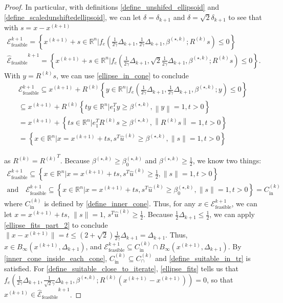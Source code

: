 \documentclass{article}
\theoremstyle{case}
\numberwithin{theorem}{subsection}
\newcommand{\bs}{{\beta^{(\star, k)}}}
\newcommand{\bsk}{{\beta_0^{(\star, k)}}}
\newcommand{\capcones}{{C^{(k)}_{\cap}}}
\newcommand{\dkpo}{\Delta_{k+1}}
\newcommand{\fcki}{{C^{(k)}_{\textrm{in}}}}
\newcommand{\huk}{{{\hat u}^{(k)}}}
\newcommand{\Rn}{\mathbb R^n}
\newcommand{\rotk}{{R^{(k)}}}
\newcommand{\trkpo}{{ B_{\infty}\left(\xkpo, \dkpo\right) }}
\newcommand{\xkpo}{{{x}^{(k+1)}}}
\newcommand{\sdkpo}{{\delta_{k+1}}}
\newcommand{\unshiftedellipsoidpo}{{\mathcal E^{k+1}_{\textrm{feasible}}}}
\newcommand{\scaledunshiftedellipsoidpo}{{{\mathcal {\hat E}_{\text{feasible}}}^{k+1}}}
\begin{document}
\begin{proof}
In particular, with definitions \cref{define_unshifed_ellipsoid} and \cref{define_scaledunshiftedellipsoid},
we can let $\delta = \sdkpo$ and $\delta = \sqrt{2}\sdkpo$ to see that with $s = x - \xkpo$
\begin{align*}
\unshiftedellipsoidpo = \left\{\xkpo + s \in \Rn | f_e\left(\frac 1 {2\gamma} \dkpo, \frac 1 {2\gamma} \dkpo, \bs; \rotk s \right) \le 0 \right\} \\
\scaledunshiftedellipsoidpo = \left\{\xkpo + s \in \Rn | f_e\left(\frac 1 {2\gamma} \dkpo, \sqrt{2} \frac {1}{2\gamma}\dkpo, \bs; \rotk s\right) \le 0 \right\}.
\end{align*}
With $y = \rotk s$,  we can use \cref{ellipse_in_cone} to conclude
\begin{align*}
\unshiftedellipsoidpo
\subseteq \xkpo + \rotk\left\{y \in \Rn | f_e\left(\frac 1 {2\gamma} \dkpo, \frac 1 {2\gamma} \dkpo, \bs; y \right) \le 0 \right\} \\
\subseteq  \xkpo + \rotk \left\{t y \in \Rn \bigg| e_1^Ty \ge \bs, \left\|y\right\| = 1, t > 0 \right\} \\
= \xkpo + \left\{t s \in \Rn \bigg| e_1^T\rotk s \ge \bs, \left\|\rotk s\right\| = 1, t > 0 \right\} \\
= \left\{x  \in \Rn \bigg| x = \xkpo + ts, s^T\huk \ge \bs, \|s\| = 1, t > 0 \right\}
\end{align*}

as $\rotk = \rotk^T$.
Because $\bs \ge \bsk$ and $\bs \ge \frac 1 2$, we know two things:
\begin{align*}
\unshiftedellipsoidpo \subseteq \left\{x \in \Rn | x = \xkpo + ts, s^T\huk \ge \frac 1 2, \|s\|= 1, t > 0 \right\} \\
\textrm{and} \quad \unshiftedellipsoidpo \subseteq \left\{x \in \Rn | x = \xkpo + ts, s^T\huk \ge \bsk, \|s\|= 1, t > 0 \right\} = \fcki
\end{align*}
where $\fcki$ is defined by \cref{define_inner_cone}.
Thus, for any $x \in \unshiftedellipsoidpo$, we can let $x = \xkpo + ts$, $\|s\| = 1$, $s^T\huk \ge \frac 1 2$.
Because $\frac 1 2 \dkpo \le \frac 1 2$, we can apply \cref{ellipse_fits_part_2} to conclude $\|x - \xkpo\| = t \le \left(2 + \sqrt{2}\right)\frac 1 {2\gamma} \dkpo = \dkpo$.
Thus, $x \in \trkpo$, and $\unshiftedellipsoidpo \subseteq \fcki \cap \trkpo$.
By \cref{inner_cone_inside_each_cone}, $\fcki \subseteq \capcones$ and \cref{define_suitable_in_tr} is satisfied.
For \cref{define_suitable_close_to_iterate}, \cref{ellipse_fits} tells us that
$f_e\left(\frac 1 {2\gamma} \dkpo, \frac 1 {\sqrt{2}\gamma}\dkpo, \bs; \rotk\left(\xkpo - \xkpo\right)\right) = 0$, so that $\xkpo \in \scaledunshiftedellipsoidpo$.
\end{proof}
\end{document}

